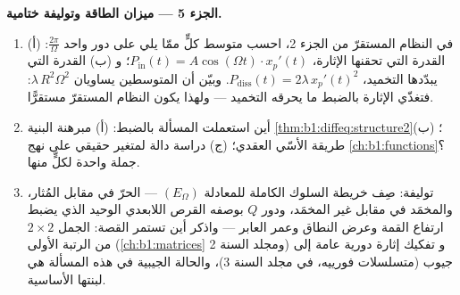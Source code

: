 \begin{problem}
\medskip
\noindent\textbf{الجزء 5 --- ميزان الطاقة وتوليفة ختامية.}
\begin{enumerate}[resume]
  \item في النظام المستقرّ من الجزء 2، احسب متوسط
        كلٍّ ممّا يلي على دور واحد $\frac{2\pi}\Omega$: (أ) القدرة
        التي تحقنها الإثارة، $P_{\mathrm{in}}(t) = A\cos(\Omega t)
        \cdot x_p'(t)$؛ و (ب) القدرة التي يبدّدها
        التخميد، $P_{\mathrm{diss}}(t) = 2\lambda\,x_p'(t)^2$.
        وبيّن أن المتوسطين يساويان $\lambda\,R^2\Omega^2$: فتغذّي
        الإثارة بالضبط ما يحرقه التخميد --- ولهذا
        يكون النظام المستقرّ مستقرًّا.
  \item أين استعملت المسألة بالضبط: (أ) مبرهنة البنية
        \cref{thm:b1:diffeq:structure2}؛ (ب) طريقة الأسّي
        العقدي؛ (ج) دراسة دالة لمتغير حقيقي
        على نهج \cref{ch:b1:functions}؟ جملة واحدة
        لكلٍّ منها.
  \item توليفة: صِف خريطة السلوك الكاملة للمعادلة $(E_\Omega)$
        --- الحرّ في مقابل المُثار، والمخمَد في مقابل غير المخمَد،
        ودور $Q$ بوصفه القرص اللابعدي الوحيد الذي يضبط ارتفاع
        القمة وعرض النطاق وعمر العابر --- واذكر
        أين تستمر القصة: الجمل $2 \times 2$ من الرتبة الأولى
        (\cref{ch:b1:matrices} ومجلد السنة 2) و
        تفكيك إثارة دورية عامة إلى
        جيوب (متسلسلات فورييه، في مجلد السنة 3)، والحالة
        الجيبية في هذه المسألة هي لبنتها الأساسية.
\end{enumerate}
\end{problem}

